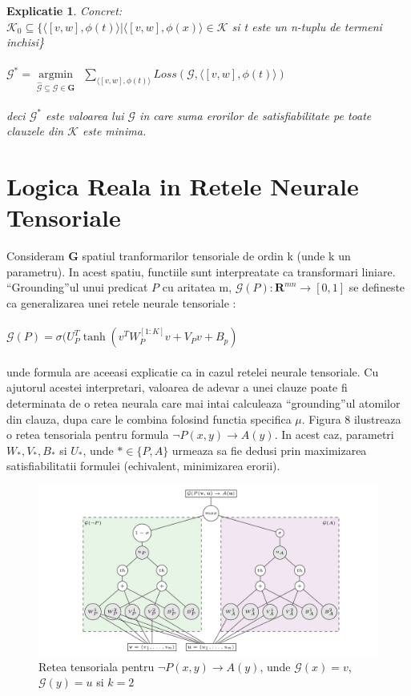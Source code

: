 \documentclass{article}
\newtheorem{explanado}{Explicatie}[section]
\begin{document}
\begin{explanado}
Concret:\\
$\mathcal{K}_0 \subseteq \{ \langle [v, w], \phi(t) \rangle | \langle [v, w], \phi(x) \rangle \in \mathcal{K}$ si t este un n-tuplu de termeni inchisi\}\\ \\
$\mathcal{G}^* = \underset{\widehat{\mathcal{G}} \subseteq \mathcal{G} \in \mathbf{G}}{\operatorname{argmin}} \ \  \underset{\langle [v, w], \phi(t) \rangle}{\sum} Loss(\mathcal{G}, \langle[v, w], \phi(t) \rangle)$  \\ \\ deci $\mathcal{G}^*$ este valoarea lui $\mathcal{G}$ in care suma erorilor de satisfiabilitate pe toate clauzele din $\mathcal{K}$ este minima.
\end{explanado}

\section{Logica Reala in Retele Neurale Tensoriale}	
Consideram $\mathbf{G}$ spatiul tranformarilor tensoriale de ordin k (unde k un parametru). In acest spatiu, functiile sunt interpreatate ca transformari liniare. ``Grounding''ul unui predicat $P$ cu aritatea m, $\mathcal{G}(P): \mathbf{R}^{mn} \rightarrow [0, 1]$ se defineste ca generalizarea unei retele neurale tensoriale \cite{NTN}: \\ \\
$\mathcal{G}(P) = \sigma (U_P^T \tanh(v^T W_P^{[1:K]} v + V_P v + B_p)$\\ \\
unde formula are aceeasi explicatie ca in cazul retelei neurale tensoriale. Cu ajutorul acestei interpretari, valoarea de adevar a unei clauze poate fi determinata de o retea neurala care mai intai calculeaza ``grounding''ul atomilor din clauza, dupa care le combina folosind functia specifica $\mu$. Figura 8 ilustreaza o retea tensoriala pentru formula $\neg P(x, y) \rightarrow A(y)$. In acest caz, parametri $W_*, V_*, B_*$ si $U_*$, unde $* \in \{P, A\}$ urmeaza sa fie dedusi prin maximizarea satisfiabilitatii formulei (echivalent, minimizarea erorii). \cite{LTN}

\begin{figure}
	\includegraphics[scale=0.2]{ltn_exp}
	\caption{Retea tensoriala pentru $\neg P(x, y) \rightarrow A(y)$, unde $\mathcal{G}(x) = v$, $\mathcal{G}(y) = u$ si $k = 2$ \cite{LTN}}
\end{figure}
\end{document}
